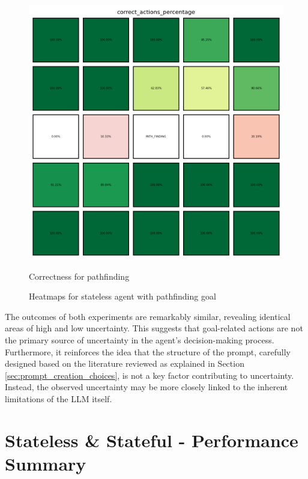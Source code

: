 \begin{figure}[h!]
\begin{minipage}[b]{0.45\textwidth}
    \includegraphics[width=\textwidth]{
      images/results_discussion/path_finding/correct_actions_percentage_PERC.png
    }
    \caption{Correctness for pathfinding}
    \label{fig:path_finding_corr}
  \end{minipage}
  \caption{Heatmaps for stateless agent with pathfinding goal}
  \label{fig:path_finding}
\end{figure}

The outcomes of both experiments are remarkably similar, revealing identical
areas of high and low uncertainty. This suggests that goal-related actions are not
the primary source of uncertainty in the agent's decision-making process.
Furthermore, it reinforces the idea that the structure of the prompt, carefully
designed based on the literature reviewed as explained in Section
\ref{sec:prompt_creation_choices}, is not a key factor contributing to uncertainty.
Instead, the observed uncertainty may be more closely linked to the inherent limitations
of the LLM itself.

\section{Stateless \& Stateful - Performance Summary}
\label{sec:stateless_and_stateful_combined_results}

